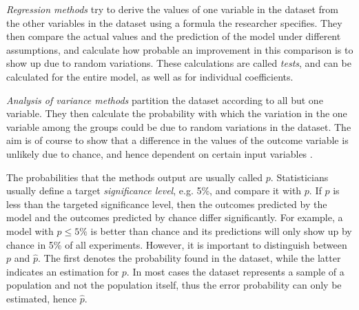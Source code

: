\documentclass[a4paper,man,12pt,apacite,floatsintext,draftfirst]{apa6} %
\begin{document}
\emph{Regression methods} try to derive the values of
one variable in the dataset from the other variables in the dataset using a formula the
researcher specifies.
They then compare the actual values and the prediction of the model under
different assumptions, and calculate how probable an improvement in this
comparison is to show up due to random variations.
These calculations are called \emph{tests}, and can be calculated for the
entire model, as well as for individual coefficients. \cite{wpRA}

\emph{Analysis of variance methods} partition the dataset
according to all but one variable.
They then calculate the probability with
which the variation in the one variable among the groups could be due to
random variations in the dataset.
The aim is of course to show that a difference in the values of the outcome
variable is unlikely due to chance, and hence dependent on certain
input variables \cite{wpAOV}.

The probabilities that the methods output are usually called \(p\).
Statisticians usually define a target \emph{significance level},
e.g. 5\%, and compare it with \(p\).
If \(p\) is less than the targeted significance level, then
the outcomes predicted by the model and the outcomes predicted by chance
differ significantly.
For example, a model with \(p \le 5\%\) is better than chance and its
predictions will only show up by chance in 5\% of all experiments.
However, it is important to distinguish between \(p\) and \(\hat{p}\).
The first denotes the probability found in the dataset, while the latter
indicates an estimation for \(p\).
In most cases the dataset represents a sample of a population and not the
population itself, thus the error probability can only be estimated,
hence \(\hat{p}\).
\end{document}
